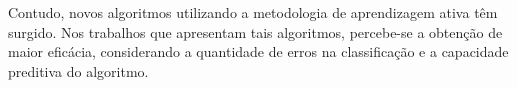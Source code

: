 \documentclass[qual, classic, a4paper]{ufbathesis}
\begin{document}
Contudo, novos algoritmos utilizando a metodologia de aprendizagem ativa têm surgido. Nos trabalhos que apresentam tais algoritmos, percebe-se a obtenção de maior eficácia, considerando a quantidade de erros na classificação e a capacidade preditiva do algoritmo.




\backmatter





% 
% 
% 

\end{document}
